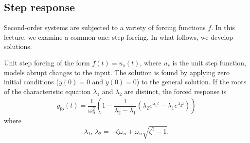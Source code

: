 \documentclass[dynamic_systems.tex]{subfiles}
\begin{document}
\subsection{Step response}
\tags{}

Second-order systems are subjected to a variety of forcing functions $f$.
In this lecture, we examine a common one: step forcing.
In what follows, we develop  solutions.
\tags{}

Unit step forcing of the form $f(t) = u_s(t)$, where $u_s$ is the unit step function, models abrupt changes to the input.
The solution is found by applying zero initial conditions ($y(0) = 0$ and $\dot{y}(0) = 0$) to the general solution.
If the roots of the characteristic equation $\lambda_1$ and $\lambda_2$ are distinct, the forced response is
\tags{}
\begin{align}\label{eq:forced2}
	y_\text{fo}(t) = \dfrac{1}{\omega_n^2} 
	\left(
		1 -
		\dfrac{1}{\lambda_2-\lambda_1} 
		\left(
			\lambda_2 e^{\lambda_1 t} -
			\lambda_1 e^{\lambda_2 t}
		\right)
	\right)
\end{align}
where
\begin{equation} \label{eq:lambda3}
	\lambda_1 \text{, } \lambda_2 = -\zeta \omega_n \pm \omega_n \sqrt{\zeta^2 - 1}.
\end{equation}
\end{document}
